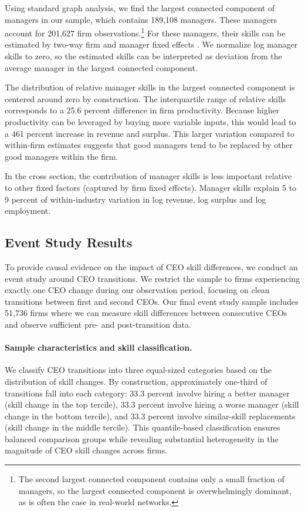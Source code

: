 \documentclass[11pt,a4paper]{article}
\begin{document}
Using standard graph analysis, we find the largest connected component of managers in our sample, which contains 189,108 managers. These managers account for 201,627 firm observations.\footnote{The second largest connected component contains only a small fraction of managers, so the largest connected component is overwhelmingly dominant, as is often the case in real-world networks.} For these managers, their skills can be estimated by two-way firm and manager fixed effects \citep{Abowd1999Econometrica,reghdfe}. We normalize log manager skills to zero, so the estimated skills can be interpreted as deviation from the average manager in the largest connected component. 

The distribution of relative manager skills in the largest connected component is centered around zero by construction. The interquartile range of relative skills corresponds to a 25.6 percent difference in firm productivity. Because higher productivity can be leveraged by buying more variable inputs, this would lead to a 461 percent increase in revenue and surplus. This larger variation compared to within-firm estimates suggests that good managers tend to be replaced by other good managers within the firm. 

In the cross section, the contribution of manager skills is less important relative to other fixed factors (captured by firm fixed effects). Manager skills explain 5 to 9 percent of within-industry variation in log revenue, log surplus and log employment.

\subsection{Event Study Results}

To provide causal evidence on the impact of CEO skill differences, we conduct an event study around CEO transitions. We restrict the sample to firms experiencing exactly one CEO change during our observation period, focusing on clean transitions between first and second CEOs. Our final event study sample includes 51,736 firms where we can measure skill differences between consecutive CEOs and observe sufficient pre- and post-transition data.

\paragraph{Sample characteristics and skill classification.} We classify CEO transitions into three equal-sized categories based on the distribution of skill changes. By construction, approximately one-third of transitions fall into each category: 33.3 percent involve hiring a better manager (skill change in the top tercile), 33.3 percent involve hiring a worse manager (skill change in the bottom tercile), and 33.3 percent involve similar-skill replacements (skill change in the middle tercile). This quantile-based classification ensures balanced comparison groups while revealing substantial heterogeneity in the magnitude of CEO skill changes across firms.
\end{document}
